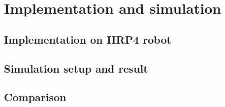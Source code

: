 \documentclass[main.tex]{subfiles}
\begin{document}
\section{Implementation and simulation}\label{sec:sim_impl}
\subsection{Implementation on HRP4 robot}
\subsection{Simulation setup and result}
\subsection{Comparison}
\end{document}
